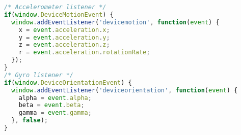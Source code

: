 \begin{lstlisting}[language=javascript]
/* Accelerometer listener */
if(window.DeviceMotionEvent) {
  window.addEventListener('devicemotion', function(event) {
    x = event.acceleration.x;
    y = event.acceleration.y;
    z = event.acceleration.z;
    r = event.acceleration.rotationRate;
  });
}
/* Gyro listener */
if(window.DeviceOrientationEvent) {
  window.addEventListener('deviceorientation', function(event) {
    alpha = event.alpha;        
    beta = event.beta;
    gamma = event.gamma;
  }, false);
}
\end{lstlisting}